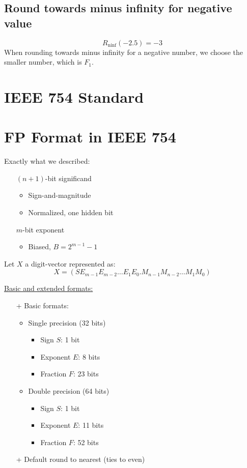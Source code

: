 \documentclass[12pt,openany, tikz,border=10pt]{book}
\begin{document}
\subsection*{Round towards minus infinity for negative value}
\[ R_{\text{ninf}}(-2.5) = -3 \]
When rounding towards minus infinity for a negative number, we choose the smaller number, which is \( F_1 \).


\newpage 
\section{IEEE 754 Standard}
\section*{FP Format in IEEE 754}

Exactly what we described:
\begin{itemize}
    \item[] \( (n + 1) \)-bit significand
    \begin{itemize}
        \item Sign-and-magnitude
        \item Normalized, one hidden bit
    \end{itemize}
    \item[] \( m \)-bit exponent
    \begin{itemize}
        \item Biased, \( B = 2^{m-1} - 1 \)
    \end{itemize}
\end{itemize}

Let \( X \) a digit-vector represented as:
\[ X = (S E_{m-1} E_{m-2} \ldots E_1 E_0 . M_{n-1} M_{n-2} \ldots M_1 M_0) \]

\underline{Basic and extended formats:}
\begin{itemize}
    \item[+] Basic formats:
    \begin{itemize}
        \item Single precision (32 bits)
        \begin{itemize}
            \item Sign \( S \): 1 bit
            \item Exponent \( E \): 8 bits
            \item Fraction \( F \): 23 bits
        \end{itemize}
        \item Double precision (64 bits)
        \begin{itemize}
            \item Sign \( S \): 1 bit
            \item Exponent \( E \): 11 bits
            \item Fraction \( F \): 52 bits
        \end{itemize}
    \end{itemize}
    \item[+] Default round to nearest (ties to even)
\end{itemize}
\end{document}
